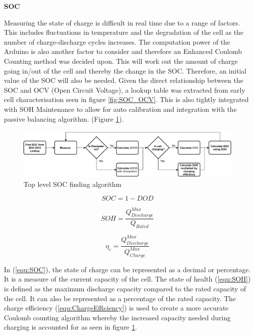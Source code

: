 \documentclass[10pt,twoside]{article}
\begin{document}
\textbf{SOC}

Measuring the state of charge is difficult in real time due to a range of factors. This includes fluctuations in temperature and the degradation of the cell as the number of charge-discharge cycles increases. The computation power of the Arduino is also another factor to consider and therefore an Enhanced Coulomb Counting method \cite{Ng2009EnhancedBatteries} was decided upon. This will work out the amount of charge going in/out of the cell and thereby the change in the SOC. Therefore, an initial value of the SOC will also be needed. Given the direct relationship between the SOC and OCV (Open Circuit Voltage), a lookup table was extracted from early cell characterisation seen in figure \ref{fig:SOC_OCV}. This is also tightly integrated with SOH Maintenance to allow for auto calibration and integration with the passive balancing algorithm. (Figure \ref{fig:SOCFlow}). 

\begin{figure}[hbt]
    \centering
    \includegraphics[scale = 0.65]{ColoumbCounting (2).pdf}
    \caption{Top level SOC finding algorithm}
    \label{fig:SOCFlow}
\end{figure}


\noindent\begin{minipage}{.32\linewidth}
\begin{equation}
    SOC = 1 - DOD
  \label{equ:SOC}
\end{equation}
\end{minipage}
\begin{minipage}{.32\linewidth}
\begin{equation}
    SOH = \frac{Q_{Discharge}^{Max}}{Q_{Rated}}
  \label{equ:SOH}
\end{equation}
\end{minipage}
\begin{minipage}{.32\linewidth}
\begin{equation}
    \eta_c = \frac{Q_{Discharge}^{Max}}{Q_{Charge}^{Max}}
  \label{equ:ChargeEfficiency}
\end{equation}
\end{minipage}

In (\ref{equ:SOC}), the state of charge can be represented as a decimal or percentage. It is a measure of the current capacity of the cell. The state of health (\ref{equ:SOH}) is defined as the maximum discharge capacity compared to the rated capacity of the cell. It can also be represented as a percentage of the rated capacity. The charge efficiency (\ref{equ:ChargeEfficiency}) is used to create a more accurate Coulomb counting algorithm whereby the increased capacity needed during charging is accounted for as seen in figure \ref{fig:SOCFlow}.   
\end{document}
